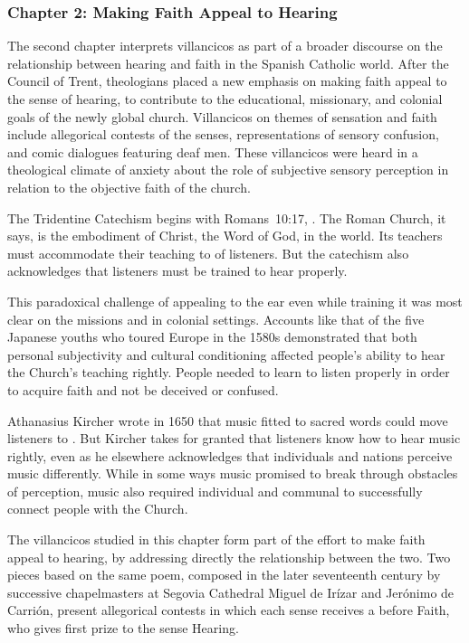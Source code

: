 \documentclass{vcbook-proposal}
\begin{document}
\subsubsection{Chapter 2: Making Faith Appeal to Hearing}

The second chapter interprets villancicos as part of a broader discourse on the relationship between hearing and faith in the Spanish Catholic world.
After the Council of Trent, theologians placed a new emphasis on making faith appeal to the sense of hearing, to contribute to the educational, missionary, and colonial goals of the newly global church.
Villancicos on themes of sensation and faith include allegorical contests of the senses, representations of sensory confusion, and comic dialogues featuring deaf men.
These villancicos were heard in a theological climate of anxiety about the role of subjective sensory perception in relation to the objective faith of the church.

The Tridentine Catechism begins with Romans~10:17, .%
  \autocite{Catholic:Catechismus1614}
The Roman Church, it says, is the embodiment of Christ, the Word of God, in the world.
Its teachers must accommodate their teaching to  of listeners.
But the catechism also acknowledges that listeners must be trained to hear properly.

This paradoxical challenge of appealing to the ear even while training it was most clear on the missions and in colonial settings.
Accounts like that of the five Japanese youths who toured Europe in the 1580s demonstrated that both personal subjectivity and cultural conditioning affected people's ability to hear the Church's teaching rightly.%
  \autocite{Massarella:JapaneseTravellers}
People needed to learn to listen properly in order to acquire faith and not be deceived or confused.

Athanasius Kircher wrote in 1650 that music fitted to sacred words could move listeners to .%
  \autocite{Kircher:Musurgia}
But Kircher takes for granted that listeners know how to hear music rightly, even as he elsewhere acknowledges that individuals and nations perceive music differently.
While in some ways music promised to break through obstacles of perception, music also required individual and communal  to successfully connect people with the Church.

The villancicos studied in this chapter form part of the effort to make faith appeal to hearing, by addressing directly the relationship between the two.
Two pieces based on the same poem, composed in the later seventeenth century by successive chapelmasters at Segovia Cathedral Miguel de Irízar and Jerónimo de Carrión, present allegorical contests in which each sense receives a  before Faith, who gives first prize to the sense Hearing.
\end{document}
